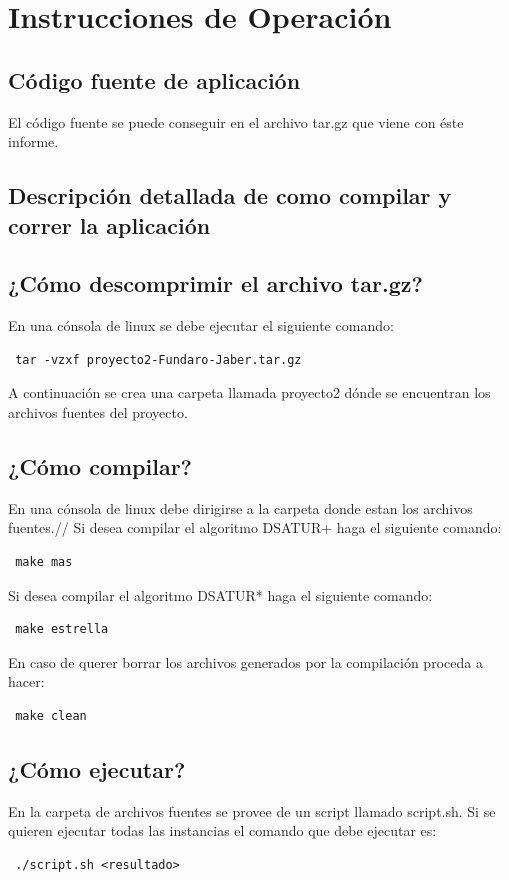 \documentclass[a4paper,10pt]{article}
\begin{document}
\section{Instrucciones de Operación}

\subsection{Código fuente de aplicación}
El código fuente se puede conseguir en el archivo tar.gz que viene con
éste informe.

\subsection{Descripción detallada de como compilar y correr la aplicación}

\subsection{¿Cómo descomprimir el archivo tar.gz?}
En una cónsola de linux se debe ejecutar el siguiente comando:
\begin{verbatim}
 tar -vzxf proyecto2-Fundaro-Jaber.tar.gz
\end{verbatim}
A continuación se crea una carpeta llamada proyecto2 dónde se encuentran
los archivos fuentes del proyecto.


\subsection{¿Cómo compilar?}
En una cónsola de linux debe dirigirse a la carpeta donde estan los
archivos fuentes.//
\indent Si desea compilar el algoritmo DSATUR+ haga el siguiente comando:
\begin{verbatim}
 make mas
\end{verbatim}

\indent Si desea compilar el algoritmo DSATUR* haga el siguiente comando:
\begin{verbatim}
 make estrella
\end{verbatim}

En caso de querer borrar los archivos generados por la compilación
proceda a hacer:
\begin{verbatim}
 make clean
\end{verbatim}

\subsection{¿Cómo ejecutar?}
En la carpeta de archivos fuentes se provee de un script llamado
script.sh. Si se quieren ejecutar todas las instancias el comando que
debe ejecutar es:
\begin{verbatim}
 ./script.sh <resultado>
\end{verbatim}
\end{document}
